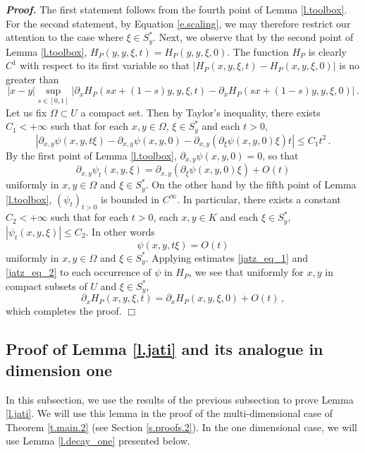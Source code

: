 \documentclass[10pt,twoside]{article}
\newenvironment{prf}[1][]
{\vskip 2mm  {\it \bf Proof#1. }}{$\Box$ \vskip 2mm}
\numberwithin{theorem}{section}
\begin{document}
\begin{prf}
The first statement follows from the fourth point of Lemma \ref{l.toolbox}. For the second statement, by Equation \eqref{e.scaling}, we may therefore restrict our attention to the case where $\xi\in S^*_y$. Next, we observe that by the second point of Lemma \ref{l.toolbox}, $H_P(y,y,\xi,t)=H_P(y,y,\xi,0)$. The function $H_P$ is clearly $C^1$ with respect to its first variable so that $|H_P(x,y,\xi,t)-H_P(x,y,\xi,0)|$ is no greater than
\[
|x-y|\sup_{s\in[0,1]}|\partial_xH_P(sx+(1-s)y,y,\xi,t)-\partial_xH_P(sx+(1-s)y,y,\xi,0)|\, .
\]
Let us fix $\Omega\subset U$ a compact set. Then by Taylor's inequality, there exists $C_1<+\infty$ such that for each $x,y\in \Omega$, $\xi\in S^*_y$ and each $t>0$,
\[
|\partial_{x,y}\psi(x,y,t\xi)-\partial_{x,y}\psi(x,y,0)-\partial_{x,y}(\partial_\xi\psi(x,y,0)\xi)t|\leq C_1t^2\, .
\]
By the first point of Lemma \ref{l.toolbox}, $\partial_{x,y}\psi(x,y,0)=0$, so that
\begin{equation}\label{jatz_eq_1}
\partial_{x,y}\psi_t(x,y,\xi)=\partial_{x,y}(\partial_\xi\psi(x,y,0)\xi)+O(t)
\end{equation}
uniformly in $x,y\in \Omega$ and $\xi\in S^*_y$. On the other hand by the fifth point of Lemma \ref{l.toolbox}, $(\psi_t)_{t>0}$ is bounded in $C^\infty$. In particular, there exists a constant $C_2<+\infty$ such that for each $t>0$, each $x,y\in K$ and each $\xi\in S^*_y$, $|\psi_t(x,y,\xi)|\leq C_2$. In other words
\begin{equation}\label{jatz_eq_2}
\psi(x,y,t\xi)=O(t)
\end{equation}
uniformly in $x,y\in \Omega$ and $\xi\in S^*_y$. Applying estimates \eqref{jatz_eq_1} and \eqref{jatz_eq_2} to each occurrence of $\psi$ in $H_P$, we see that uniformly for $x,y$ in compact subsets of $U$ and $\xi\in S^*_y$,
\[
\partial_xH_P(x,y,\xi,t)=\partial_xH_P(x,y,\xi,0)+O(t)\, ,
\]
which completes the proof.
\end{prf}

\subsection{Proof of Lemma \ref{l.jati} and its analogue in dimension one}\label{ss.jp}

In this subsection, we use the results of the previous subsection to prove Lemma \ref{l.jati}. We will use this lemma in the proof of the multi-dimensional case of Theorem \ref{t.main.2} (see Section \ref{s.proofs.2}). In the one dimensional case, we will use Lemma \ref{l.decay_one} presented below.
\end{document}
